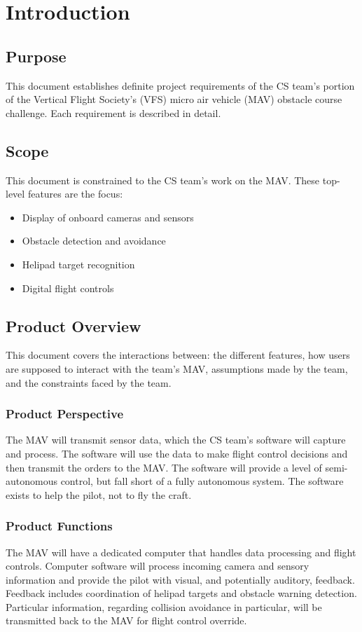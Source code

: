 \documentclass[onecolumn, draftclsnofoot, 10pt, compsoc]{IEEEtran}
\begin{document}
\section{Introduction}
\subsection{Purpose}
This document establishes definite project requirements of the CS team’s portion of the Vertical Flight Society’s (VFS) micro air vehicle (MAV) obstacle course challenge. Each requirement is described in detail.
\subsection{Scope}
This document is constrained to the CS team’s work on the MAV. These top-level features are the focus:
\begin{itemize}
    \item Display of onboard cameras and sensors
    \item Obstacle detection and avoidance
    \item Helipad target recognition
    \item Digital flight controls
\end{itemize}
\subsection{Product Overview}
This document covers the interactions between: the different features, how users are supposed to interact with the team’s MAV, assumptions made by the team, and the constraints faced by the team.
\subsubsection{Product Perspective}
The MAV will transmit sensor data, which the CS team’s software will capture and process. The software will use the data to make flight control decisions and then transmit the orders to the MAV. The software will provide a level of semi-autonomous control, but fall short of a fully autonomous system. The software exists to help the pilot, not to fly the craft.
\subsubsection{Product Functions}
The MAV will have a dedicated computer that handles data processing and flight controls. Computer software will process incoming camera and sensory information and provide the pilot with visual, and potentially auditory, feedback. Feedback includes coordination of helipad targets and obstacle warning detection. Particular information, regarding collision avoidance in particular, will be transmitted back to the MAV for flight control override.
\end{document}
